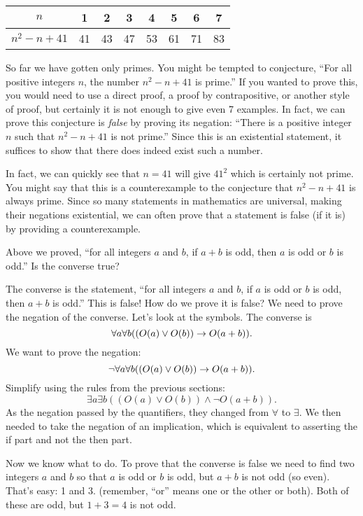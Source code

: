 \documentclass[12pt]{article}
\begin{document}
\begin{center}
\begin{tabular}{c|c|c|c|c|c|c|c}
$n$ & 1 & 2 & 3 & 4 & 5 & 6 & 7\\ \hline
$n^2 - n + 41$ & 41 & 43 & 47 & 53 & 61 & 71 & 83
 \end{tabular}
\end{center}

So far we have gotten only primes.  You might be tempted to conjecture, ``For all positive integers $n$, the number $n^2 - n + 41$ is prime.''  If you wanted to prove this, you would need to use a direct proof, a proof by contrapositive, or another style of proof, but certainly it is not enough to give even 7 examples.  In fact, we can prove this conjecture is {\em false} by proving its negation: ``There is a positive integer $n$ such that $n^2 - n + 41$ is not prime.''  Since this is an existential statement, it suffices to show that there does indeed exist such a number.

In fact, we can quickly see that $n = 41$ will give $41^2$ which is certainly not prime.  You might say that this is a counterexample to the conjecture that $n^2 - n + 41$ is always prime.  Since so many statements in mathematics are universal, making their negations existential, we can often prove that a statement is false (if it is) by providing a counterexample.

\begin{example}
     Above we proved, ``for all integers $a$ and $b$, if $a+b$ is odd, then $a$ is odd or $b$ is odd.''  Is the converse true?

     \begin{solution}
     The converse is the statement, ``for all integers $a$ and $b$, if $a$ is odd or $b$ is odd, then $a + b$ is odd.''  This is false!  How do we prove it is false?  We need to prove the negation of the converse.  Let's look at the symbols.  The converse is
          \[\forall a \forall b ((O(a) \vee O(b)) \rightarrow O(a+b)).\]
          We want to prove the negation:
          \[\neg \forall a \forall b ((O(a) \vee O(b)) \rightarrow O(a+b)).\]
          Simplify using the rules from the previous sections:
          \[\exists a \exists b ((O(a) \vee O(b)) \wedge \neg O(a+b)).\]
          As the negation passed by the quantifiers, they changed from $\forall$ to $\exists$.  We then needed to take the negation of an implication, which is equivalent to asserting the if part and not the then part.

          Now we know what to do.  To prove that the converse is false we need to find two integers $a$ and $b$ so that $a$ is odd or $b$ is odd, but $a+b$ is not odd (so even).  That's easy: 1 and 3.  (remember, ``or'' means one or the other or both).  Both of these are odd, but $1+3 = 4$ is not odd.
     \end{solution}

\end{example}
\end{document}
